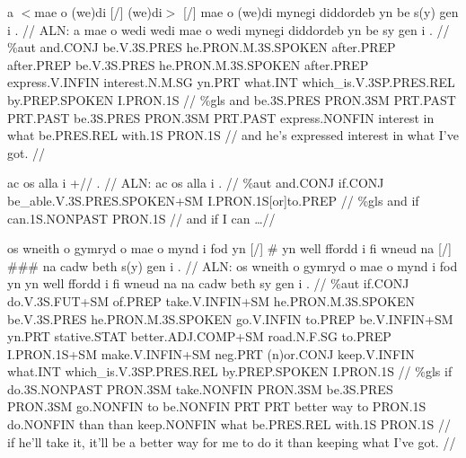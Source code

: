 \documentclass[a4paper,10pt]{article}
\begin{document}
\ex
\begingl[lingstyle=gergl]
\glchat a $<$mae o (we)di [/] (we)di$>$ [/] mae o (we)di mynegi diddordeb yn be s(y) gen i . //
\glsurface ALN:  a mae o wedi wedi mae o wedi mynegi diddordeb yn be sy gen i .  //
\glauto \%aut  and{\scriptsize .CONJ} be{\scriptsize .V.3S.PRES} he{\scriptsize .PRON.M.3S.SPOKEN} after{\scriptsize .PREP} after{\scriptsize .PREP} be{\scriptsize .V.3S.PRES} he{\scriptsize .PRON.M.3S.SPOKEN} after{\scriptsize .PREP} express{\scriptsize .V.INFIN} interest{\scriptsize .N.M.SG} yn{\scriptsize .PRT} what{\scriptsize .INT} which\_is{\scriptsize .V.3SP.PRES.REL} by{\scriptsize .PREP.SPOKEN} I{\scriptsize .PRON.1S}   //
\glmanual \%gls  and be{\scriptsize .3S.PRES} PRON{\scriptsize .3SM} PRT{\scriptsize .PAST} PRT{\scriptsize .PAST} be{\scriptsize .3S.PRES} PRON{\scriptsize .3SM} PRT{\scriptsize .PAST} express{\scriptsize .NONFIN} interest in what be{\scriptsize .PRES.REL} with{\scriptsize .1S} PRON{\scriptsize .1S}   //
\gleng and he's expressed interest in what I've got. //
\endgl
\xe

\ex
\begingl[lingstyle=gergl]
\glchat ac os alla i +// . //
\glsurface ALN:  ac os alla i .  //
\glauto \%aut  and{\scriptsize .CONJ} if{\scriptsize .CONJ} be\_able{\scriptsize .V.3S.PRES.SPOKEN+SM} I{\scriptsize .PRON.1S[or]to.PREP}   //
\glmanual \%gls  and if can{\scriptsize .1S.NONPAST} PRON{\scriptsize .1S}   //
\gleng and if I can \dots  //
\endgl
\xe

\ex
\begingl[lingstyle=gergl]
\glchat os wneith o gymryd o mae o mynd i fod yn [/] \# yn well ffordd i fi wneud na [/] \#\#\# na cadw beth s(y) gen i . //
\glsurface ALN:  os wneith o gymryd o mae o mynd i fod yn yn well ffordd i fi wneud na na cadw beth sy gen i .  //
\glauto \%aut  if{\scriptsize .CONJ} do{\scriptsize .V.3S.FUT+SM} of{\scriptsize .PREP} take{\scriptsize .V.INFIN+SM} he{\scriptsize .PRON.M.3S.SPOKEN} be{\scriptsize .V.3S.PRES} he{\scriptsize .PRON.M.3S.SPOKEN} go{\scriptsize .V.INFIN} to{\scriptsize .PREP} be{\scriptsize .V.INFIN+SM} yn{\scriptsize .PRT} stative{\scriptsize .STAT} better{\scriptsize .ADJ.COMP+SM} road{\scriptsize .N.F.SG} to{\scriptsize .PREP} I{\scriptsize .PRON.1S+SM} make{\scriptsize .V.INFIN+SM} neg{\scriptsize .PRT} (n)or{\scriptsize .CONJ} keep{\scriptsize .V.INFIN} what{\scriptsize .INT} which\_is{\scriptsize .V.3SP.PRES.REL} by{\scriptsize .PREP.SPOKEN} I{\scriptsize .PRON.1S}   //
\glmanual \%gls  if do{\scriptsize .3S.NONPAST} PRON{\scriptsize .3SM} take{\scriptsize .NONFIN} PRON{\scriptsize .3SM} be{\scriptsize .3S.PRES} PRON{\scriptsize .3SM} go{\scriptsize .NONFIN} to be{\scriptsize .NONFIN} PRT PRT better way to PRON{\scriptsize .1S} do{\scriptsize .NONFIN} than than keep{\scriptsize .NONFIN} what be{\scriptsize .PRES.REL} with{\scriptsize .1S} PRON{\scriptsize .1S}   //
\gleng if he'll take it, it'll be a better way for me to do it than keeping what I've got. //
\endgl
\xe
\end{document}
